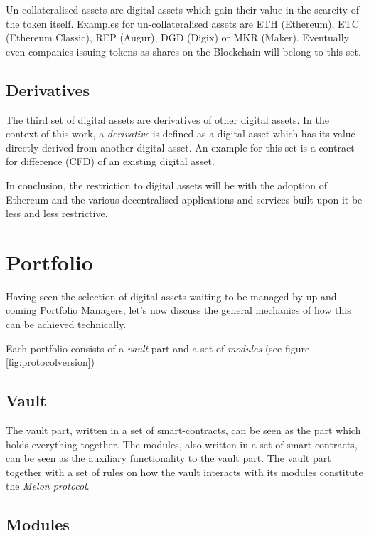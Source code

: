 \documentclass[9pt,oneside]{amsart}
\theoremstyle{plain}
\begin{document}
\begin{multicols}{2}
Un-collateralised assets are digital assets which gain their value in the scarcity of the token itself.
Examples for un-collateralised assets are ETH (Ethereum\cite{ethereum}), ETC (Ethereum Classic\cite{ethereumclassic}), REP (Augur\cite{augur}), DGD (Digix\cite{digix}) or MKR (Maker\cite{makerdao}). Eventually even companies issuing tokens as shares on the Blockchain will belong to this set.

\subsection{Derivatives}\label{sub:derivatives}

The third set of digital assets are derivatives of other digital assets. In the context of this work, a \textit{derivative} is defined as a digital asset which has its value directly derived from another digital asset.
An example for this set is a contract for difference (CFD) of an existing digital asset.

In conclusion, the restriction to digital assets will be with the adoption of Ethereum and the various decentralised applications and services built upon it be less and less restrictive.

\section{Portfolio}\label{sec:portfolio}

Having seen the selection of digital assets waiting to be managed by up-and-coming Portfolio Managers, let's now discuss the general mechanics of how this can be achieved technically.

Each portfolio consists of a \textit{vault} part and a set of \textit{modules} (see figure \ref{fig:protocolversion})

\subsection{Vault}\label{sub:vault}

The vault part, written in a set of smart-contracts, can be seen as the part which holds everything together. The modules, also written in a set of smart-contracts, can be seen as the auxiliary functionality to the vault part. The vault part together with a set of rules on how the vault interacts with its modules constitute the \textit{Melon protocol}.

\subsection{Modules}\label{sub:modules}


\end{multicols}
\end{document}
